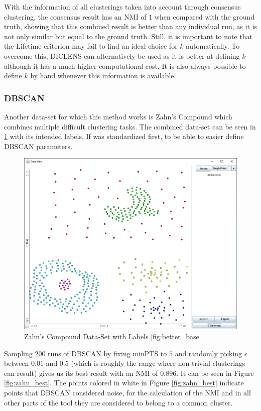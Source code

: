 \documentclass[
	a4paper,
	english,
	twoside,
	openright,               
	11pt                            
	]{report}
\begin{document}
With the information of all clusterings taken into account through consensus clustering, the consensus result has an NMI of $1$ when compared with the ground truth, showing that this combined result is better than any individual run, as it is not only similar but equal to the ground truth. Still, it is important to note that the Lifetime criterion may fail to find an ideal choice for $k$ automatically. To overcome this, DICLENS can alternatively be used as it is better at defining $k$ although it has a much higher computational cost. It is also always possible to define $k$ by hand whenever this information is available.

\subsubsection{DBSCAN}
Another data-set for which this method works is Zahn's Compound \cite{1671676} which combines multiple difficult clustering tasks. The combined data-set can be seen in \ref{fig:zahn} with its intended labels. If was standardized first, to be able to easier define DBSCAN parameters.

\begin{figure}[h]
	\centering
	\includegraphics[scale=.4]{zahn}
	\caption{Zahn's Compound Data-Set with Labels \ref{fig:better_base}}
	\label{fig:zahn}
\end{figure}

Sampling 200 runs of DBSCAN by fixing minPTS to $5$ and randomly picking $\epsilon$ between $0.01$ and $0.5$ (which is roughly the range where non-trivial clusterings can result) gives us its best result with an NMI of $0.896$. It can be seen in Figure \ref{fig:zahn_best}. The points colored in white in Figure \ref{fig:zahn_best} indicate points that DBSCAN considered noise, for the calculation of the NMI and in all other parts of the tool they are considered to belong to a common cluster.
\end{document}
